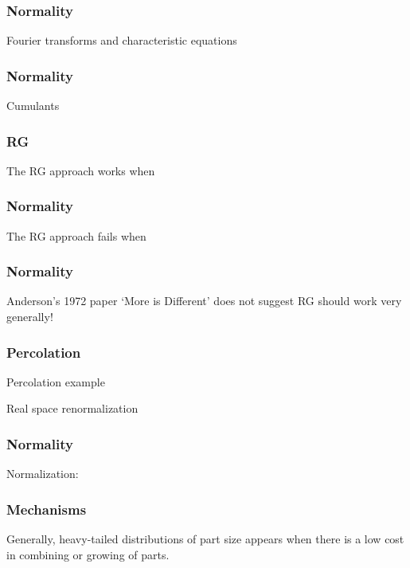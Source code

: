 \begin{frame}
  \frametitle{Normality}

  Fourier transforms and
  characteristic equations

\end{frame}

\begin{frame}
  \frametitle{Normality}

  Cumulants

\end{frame}

\begin{frame}
  \frametitle{RG}

  The RG approach works when

\end{frame}

\begin{frame}
  \frametitle{Normality}

  The RG approach fails when

\end{frame}

\begin{frame}
  \frametitle{Normality}

  Anderson's 1972 paper `More is Different'
  does not suggest RG should work 
  very generally!


\end{frame}

\begin{frame}
  \frametitle{Percolation}

  Percolation example

  Real space renormalization

\end{frame}

\begin{frame}
  \frametitle{Normality}

  Normalization:





\end{frame}

\begin{frame}
  \frametitle{Mechanisms}

  Generally, heavy-tailed distributions of
  part size appears when there is a low cost in combining or growing
  of parts.


\end{frame}

